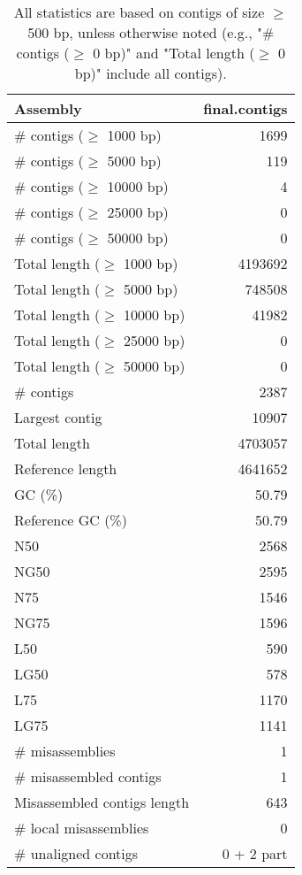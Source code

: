 \documentclass[12pt,a4paper]{article}
\begin{document}
\begin{table}[ht]
\begin{center}
\caption{All statistics are based on contigs of size $\geq$ 500 bp, unless otherwise noted (e.g., "\# contigs ($\geq$ 0 bp)" and "Total length ($\geq$ 0 bp)" include all contigs).}
\begin{tabular}{|l*{1}{|r}|}
\hline
Assembly & final.contigs \\ \hline
\# contigs ($\geq$ 1000 bp) & 1699 \\ \hline
\# contigs ($\geq$ 5000 bp) & 119 \\ \hline
\# contigs ($\geq$ 10000 bp) & 4 \\ \hline
\# contigs ($\geq$ 25000 bp) & 0 \\ \hline
\# contigs ($\geq$ 50000 bp) & 0 \\ \hline
Total length ($\geq$ 1000 bp) & 4193692 \\ \hline
Total length ($\geq$ 5000 bp) & 748508 \\ \hline
Total length ($\geq$ 10000 bp) & 41982 \\ \hline
Total length ($\geq$ 25000 bp) & 0 \\ \hline
Total length ($\geq$ 50000 bp) & 0 \\ \hline
\# contigs & 2387 \\ \hline
Largest contig & 10907 \\ \hline
Total length & 4703057 \\ \hline
Reference length & 4641652 \\ \hline
GC (\%) & 50.79 \\ \hline
Reference GC (\%) & 50.79 \\ \hline
N50 & 2568 \\ \hline
NG50 & 2595 \\ \hline
N75 & 1546 \\ \hline
NG75 & 1596 \\ \hline
L50 & 590 \\ \hline
LG50 & 578 \\ \hline
L75 & 1170 \\ \hline
LG75 & 1141 \\ \hline
\# misassemblies & 1 \\ \hline
\# misassembled contigs & 1 \\ \hline
Misassembled contigs length & 643 \\ \hline
\# local misassemblies & 0 \\ \hline
\# unaligned contigs & 0 + 2 part \\ \hline

\end{tabular}
\end{center}
\end{table}
\end{document}
